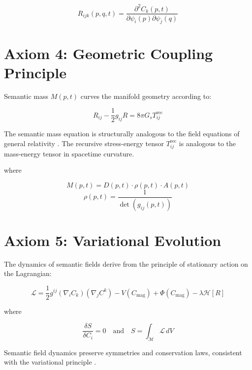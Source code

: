 \begin{equation}
R_{ijk}(p,q,t) = \frac{\partial^2 C_k(p,t)}{\partial \psi_i(p) \partial \psi_j(q)}
\end{equation}

\section{Axiom 4: Geometric Coupling Principle}

Semantic mass \(M(p,t)\) curves the manifold geometry according to:

\begin{equation}
R_{ij} - \frac{1}{2}g_{ij}R = 8\pi G_s T^{\text{rec}}_{ij}
\end{equation}

The semantic mass equation is structurally analogous to the field equations of general relativity \autocite{Einstein1915, MisnerThorneWheeler1973, Wald1984}. The recursive stress-energy tensor \(T^{\text{rec}}_{ij}\) is analogous to the mass-energy tensor in spacetime curvature.

where

\begin{equation}
M(p,t) = D(p,t) \cdot \rho(p,t) \cdot A(p,t)
\end{equation}
\begin{equation}
\rho(p,t) = \frac{1}{\det(g_{ij}(p,t))}
\end{equation}

\section{Axiom 5: Variational Evolution}

The dynamics of semantic fields derive from the principle of stationary action on the Lagrangian:

\begin{equation}
\mathcal{L} = \frac{1}{2} g^{ij} (\nabla_i C_k)(\nabla_j C^k) - V(C_{\text{mag}}) + \Phi(C_{\text{mag}}) - \lambda \mathcal{H}[R]
\end{equation}

where

\begin{equation}
\frac{\delta S}{\delta C_i} = 0 \quad \text{and} \quad S = \int_{\mathcal{M}} \mathcal{L} \, dV
\end{equation}

Semantic field dynamics preserve symmetries and conservation laws, consistent with the variational principle \autocite{GoldsteinPooleSafko2002, Arnold1989}.

